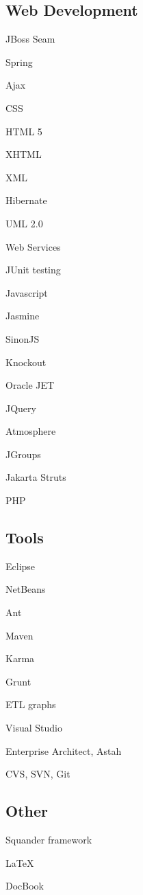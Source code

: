 \documentclass[czech]{article}
\renewenvironment{itemize}{
  \begin{list}{}{
    \setlength{\leftmargin}{1.5em}
  }
}{
  \end{list}
}
\begin{document}
\begin{multicols}{2} 
{\textcolor{coffee}{\subsection*{Web Development}}
\begin{multicols}{2}
\begin{itemize}
\item JBoss Seam
\item Spring
\item Ajax
\item CSS
\item HTML 5
\item XHTML
\item XML
\item Hibernate
\item UML 2.0
\item Web Services
\item JUnit testing
\item Javascript
\item Jasmine
\item SinonJS
\item Knockout
\item Oracle JET
\item JQuery
\item Atmosphere
\item JGroups
\item Jakarta Struts
\item PHP
\end{itemize}
\end{multicols}
}


\textcolor{coffee}{\subsection*{Tools}}

\begin{itemize}
\item Eclipse
\item NetBeans
\item Ant
\item Maven
\item Karma
\item Grunt
\item ETL graphs
\item Visual Studio
\item Enterprise Architect, Astah
\item CVS, SVN, Git
\end{itemize}
\end{multicols}


\textcolor{coffee}{\subsection*{Other}}
\begin{itemize}
\item Squander framework
\item \LaTeX
\item DocBook
 
\end{itemize}
\end{document}
